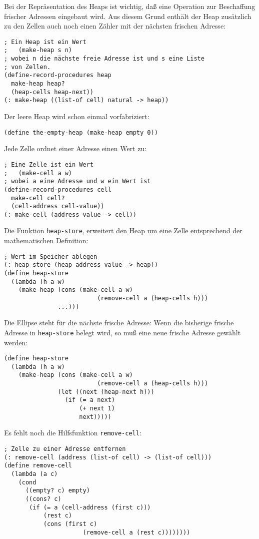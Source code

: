 %
Bei der Repräsentation des Heaps ist wichtig, daß eine Operation zur
Beschaffung frischer Adressen eingebaut wird.  Aus diesem Grund
enthält der Heap zusätzlich zu den Zellen auch noch einen Zähler mit
der nächsten frischen Adresse:
%
\begin{verbatim}
; Ein Heap ist ein Wert
;   (make-heap s n)
; wobei n die nächste freie Adresse ist und s eine Liste
; von Zellen.
(define-record-procedures heap
  make-heap heap?
  (heap-cells heap-next))
(: make-heap ((list-of cell) natural -> heap))
\end{verbatim}
%
Der leere Heap wird schon einmal vorfabriziert:
%
\begin{verbatim}
(define the-empty-heap (make-heap empty 0))
\end{verbatim}
%
Jede Zelle ordnet einer Adresse einen Wert zu:
%
\begin{verbatim}
; Eine Zelle ist ein Wert
;   (make-cell a w)
; wobei a eine Adresse und w ein Wert ist
(define-record-procedures cell
  make-cell cell?
  (cell-address cell-value))
(: make-cell (address value -> cell))
\end{verbatim}
%
Die Funktion \texttt{heap-store}, erweitert den Heap um eine Zelle
entsprechend der mathematischen Definition:
%
\begin{verbatim}
; Wert im Speicher ablegen
(: heap-store (heap address value -> heap))
(define heap-store
  (lambda (h a w)
    (make-heap (cons (make-cell a w)
                          (remove-cell a (heap-cells h)))
               ...)))
\end{verbatim}
%
Die Ellipse steht für die nächste frische Adresse: Wenn die bisherige
frische Adresse in \texttt{heap-store} belegt wird, so muß eine neue
frische Adresse gewählt werden:
%
\begin{verbatim}
(define heap-store
  (lambda (h a w)
    (make-heap (cons (make-cell a w)
                          (remove-cell a (heap-cells h)))
               (let ((next (heap-next h)))
                 (if (= a next)
                     (+ next 1)
                     next)))))
\end{verbatim}
%
Es fehlt noch die Hilfsfunktion \texttt{remove-cell}:
%
\begin{verbatim}
; Zelle zu einer Adresse entfernen
(: remove-cell (address (list-of cell) -> (list-of cell)))
(define remove-cell
  (lambda (a c)
    (cond
      ((empty? c) empty)
      ((cons? c)
       (if (= a (cell-address (first c)))
           (rest c)
           (cons (first c)
                      (remove-cell a (rest c))))))))
\end{verbatim}
